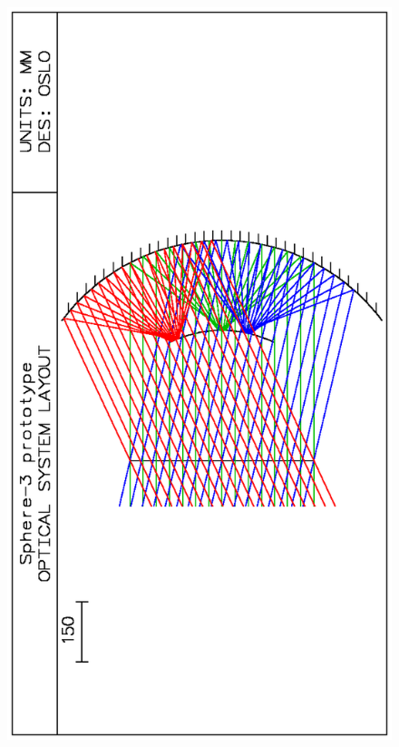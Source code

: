 \documentclass[a4paper]{jpconf}
\begin{document}
\begin{figure}
\begin{minipage}[b]{.52\textwidth}
        \includegraphics[height=.365\textheight, angle=-90]{Sphere3optic.eps}

\end{minipage}
\end{figure}
\end{document}
